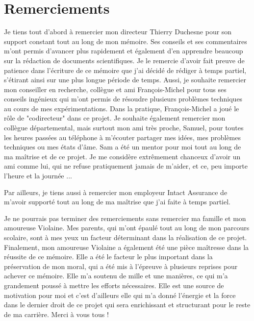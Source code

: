 \chapter*{Remerciements}        %
\label{chap:remerciements}      %

Je tiens tout d'abord à remercier mon directeur Thierry Duchesne pour son support constant tout au long de mon mémoire. Ses conseils et ses commentaires m'ont permis d'avancer plus rapidement et également d'en apprendre beaucoup sur la rédaction de documents scientifiques. Je le remercie d'avoir fait preuve de patience dans l'écriture de ce mémoire que j'ai décidé de rédiger à temps partiel, s'étirant ainsi sur une plus longue période de temps. Aussi, je souhaite remercier mon conseiller en recherche, collègue et ami François-Michel pour tous ses conseils ingénieux qui m'ont permis de résoudre plusieurs problèmes techniques au cours de mes expérimentations. Dans la pratique, François-Michel a joué le rôle de "codirecteur" dans ce projet. Je souhaite également remercier mon collègue départemental, mais surtout mon ami très proche, Samuel, pour toutes les heures passées au téléphone à m'écouter partager mes idées, mes problèmes techniques ou mes états d'âme. Sam a été un mentor pour moi tout au long de ma maîtrise et de ce projet. Je me considère extrêmement chanceux d'avoir un ami comme lui, qui ne refuse pratiquement jamais de m'aider, et ce, peu importe l'heure et la journée ... 

Par ailleurs, je tiens aussi à remercier mon employeur Intact Assurance de m'avoir supporté tout au long de ma maîtrise que j'ai faite à temps partiel.

Je ne pourrais pas terminer des remerciements sans remercier ma famille et mon amoureuse Violaine. Mes parents, qui m'ont épaulé tout au long de mon parcours scolaire, sont à mes yeux un facteur déterminant dans la réalisation de ce projet. Finalement, mon amoureuse Violaine a également été une pièce maîtresse dans la réussite de ce mémoire. Elle a été le facteur le plus important dans la préservation de mon moral, qui a été mis à l'épreuve à plusieurs reprises pour achever ce mémoire. Elle m'a soutenu de mille et une manières, ce qui m'a grandement poussé à mettre les efforts nécessaires. Elle est une source de motivation pour moi et c'est d'ailleurs elle qui m'a donné l'énergie et la force dans le dernier droit de ce projet qui sera enrichissant et structurant pour le reste de ma carrière. Merci à vous tous ! 

